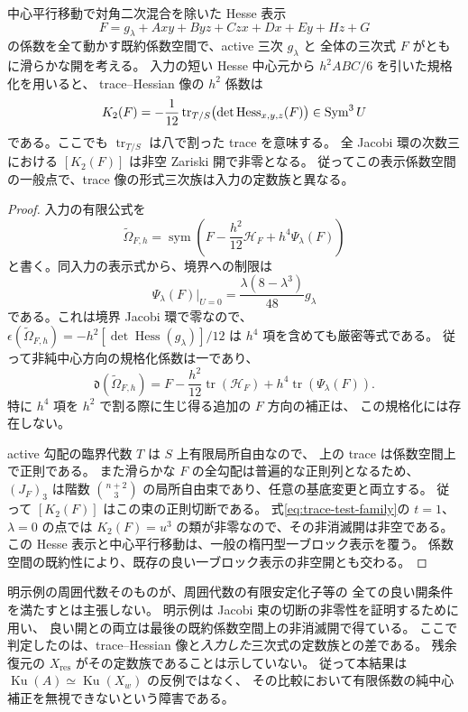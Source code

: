 \begin{corollary}[表示係数の一般点における相違]
\label{cor:trace-generic-geometric-correction}
中心平行移動で対角二次混合を除いた Hesse 表示
\[
 F=g_\lambda+Axy+Byz+Czx+Dx+Ey+Hz+G
\]
の係数を全て動かす既約係数空間で、active 三次 $g_\lambda$ と
全体の三次式 $F$ がともに滑らかな開を考える。
入力の短い Hesse 中心元から $h^2ABC/6$ を引いた規格化を用いると、
trace--Hessian 像の $h^2$ 係数は
\begin{equation}\label{eq:trace-general-second-correction}
 K_2(F)=-\frac1{12}\operatorname{tr}_{T/S}
          \bigl(\det\operatorname{Hess}_{x,y,z}(F)\bigr)
 \in\operatorname{Sym}^3U
\end{equation}
である。ここでも $\operatorname{tr}_{T/S}$ は八で割った trace を意味する。
全 Jacobi 環の次数三における $[K_2(F)]$ は非空 Zariski 開で非零となる。
従ってこの表示係数空間の一般点で、trace 像の形式三次族は入力の定数族と異なる。
\end{corollary}

\begin{proof}
入力の有限公式を
\[
 \widetilde\Omega_{F,h}=\operatorname{sym}
     \left(F-\frac{h^2}{12}\mathscr H_F+h^4\Psi_\lambda(F)\right)
\]
と書く。同入力の表示式から、境界への制限は
\[
 \Psi_\lambda(F)|_{U=0}
       =\frac{\lambda(8-\lambda^3)}{48}g_\lambda
\]
である。これは境界 Jacobi 環で零なので、
$\epsilon(\widetilde\Omega_{F,h})=-h^2[\det\operatorname{Hess}(g_\lambda)]/12$
は $h^4$ 項を含めても厳密等式である。
従って非純中心方向の規格化係数は一であり、
\[
 \mathfrak d(\widetilde\Omega_{F,h})
   =F-\frac{h^2}{12}\operatorname{tr}(\mathscr H_F)
        +h^4\operatorname{tr}(\Psi_\lambda(F)).
\]
特に $h^4$ 項を $h^2$ で割る際に生じ得る追加の $F$ 方向の補正は、
この規格化には存在しない。

active 勾配の臨界代数 $T$ は $S$ 上有限局所自由なので、
上の trace は係数空間上で正則である。
また滑らかな $F$ の全勾配は普遍的な正則列となるため、
$(J_F)_3$ は階数 $\binom{n+2}{3}$ の局所自由束であり、任意の基底変更と両立する。
従って $[K_2(F)]$ はこの束の正則切断である。
式\eqref{eq:trace-test-family}の $t=1$、$\lambda=0$ の点では
$K_2(F)=u^3$ の類が非零なので、その非消滅開は非空である。
この Hesse 表示と中心平行移動は、一般の楕円型一ブロック表示を覆う。
係数空間の既約性により、既存の良い一ブロック表示の非空開とも交わる。
\end{proof}

\begin{remark}[結論の範囲]
明示例の周囲代数そのものが、周囲代数の有限安定化子等の
全ての良い開条件を満たすとは主張しない。
明示例は Jacobi 束の切断の非零性を証明するために用い、
良い開との両立は最後の既約係数空間上の非消滅開で得ている。
ここで判定したのは、trace--Hessian 像と\emph{入力した}三次式の定数族との差である。
残余復元の $X_{\mathrm{res}}$ がその定数族であることは示していない。
従って本結果は
$\operatorname{Ku}(A)\simeq\operatorname{Ku}(X_w)$ の反例ではなく、
その比較において有限係数の純中心補正を無視できないという障害である。
\end{remark}
